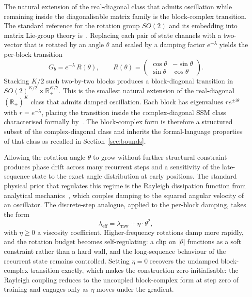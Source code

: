 The natural extension of the real-diagonal class that admits
oscillation while remaining inside the diagonalisable matrix family
is the block-complex transition. The standard reference for the
rotation group $SO(2)$ and its embedding into matrix Lie-group theory
is~\citet[Chapter 1]{hall2015lie}. Replacing each pair of state
channels with a two-vector that is rotated by an angle $\theta$ and
scaled by a damping factor $e^{-\lambda}$ yields the per-block
transition
\begin{equation}\label{eq:block-complex}
G_{b} = e^{-\lambda} \, R(\theta), \qquad R(\theta) = \begin{pmatrix} \cos\theta & -\sin\theta \\ \sin\theta & \cos\theta \end{pmatrix}.
\end{equation}
Stacking $K/2$ such two-by-two blocks produces a block-diagonal
transition in $SO(2)^{K/2} \times \mathbb{R}_{+}^{K/2}$. This is the
smallest natural extension of the real-diagonal $(\mathbb{R}_{+})^{K}$
class that admits damped oscillation. Each block has eigenvalues
$r e^{\pm i \theta}$ with $r = e^{-\lambda}$, placing the transition
inside the complex-diagonal SSM class characterised formally
by~\citet{sarrof2024expressive}. The block-complex form is therefore
a structured subset of the complex-diagonal class and inherits the
formal-language properties of that class as recalled in
Section~\ref{sec:bounds}.

Allowing the rotation angle $\theta$ to grow without further
structural constraint produces phase drift across many recurrent
steps and a sensitivity of the late-sequence state to the exact angle
distribution at early positions. The standard physical prior that
regulates this regime is the Rayleigh dissipation function from
analytical mechanics~\cite[Sections 1.5 and 2.5]{goldstein2002classical},
which couples damping to the squared angular velocity of an
oscillator. The discrete-step analogue, applied to the per-block
damping, takes the form
\begin{equation}\label{eq:rayleigh}
\lambda_{\mathrm{eff}} = \lambda_{\mathrm{raw}} + \eta \cdot \theta^{2},
\end{equation}
with $\eta \ge 0$ a viscosity coefficient. Higher-frequency rotations
damp more rapidly, and the rotation budget becomes self-regulating: a
clip on $|\theta|$ functions as a soft constraint rather than a hard
wall, and the long-sequence behaviour of the recurrent state remains
controlled. Setting $\eta = 0$ recovers the undamped block-complex
transition exactly, which makes the construction zero-initialisable:
the Rayleigh coupling reduces to the uncoupled block-complex form at
step zero of training and engages only as $\eta$ moves under the
gradient.

